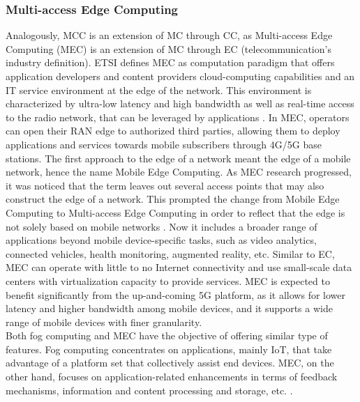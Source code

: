 \subsubsection{Multi-access Edge Computing}
\noindent Analogously, MCC is an extension of MC through CC, as Multi-access Edge Computing (MEC) is an extension of MC through EC (telecommunication's industry definition). ETSI defines MEC as computation paradigm that offers application developers and content providers cloud-computing capabilities and an IT service environment at the edge of the network. This environment is characterized by ultra-low latency and high bandwidth as well as real-time access to the radio network, that can be leveraged by applications \cite{ETSIMult81:online}. In MEC, operators can open their RAN edge to authorized third parties, allowing them to deploy applications and services towards mobile subscribers through 4G/5G base stations. The first approach to the edge of a network meant the edge of a mobile network, hence the name Mobile Edge Computing. As MEC research progressed, it was noticed that the term leaves out several access points that may also construct the edge of a network. This prompted the change from Mobile Edge Computing to Multi-access Edge Computing in order to reflect that the edge is not solely based on mobile networks \cite{MobileEd74:online}. Now it includes a broader range of applications beyond mobile device-specific tasks, such as video analytics, connected vehicles, health monitoring, augmented reality, etc. Similar to EC, MEC can operate with little to no Internet connectivity and use small-scale data centers with virtualization capacity to provide services. MEC is expected to benefit significantly from the up-and-coming 5G platform, as it allows for lower latency and higher bandwidth among mobile devices, and it supports a wide range of mobile devices with finer granularity.\\
\noindent\tab Both fog computing and MEC have the objective of offering similar type of features. Fog computing concentrates on applications, mainly IoT, that take advantage of a platform set that collectively assist end devices. MEC, on the other hand, focuses on application-related enhancements in terms of feedback mechanisms, information and content processing and storage, etc. \cite{taleb2017multi}.

